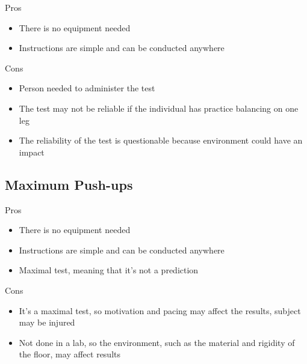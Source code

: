 \documentclass[12pt]{article}
\begin{document}
\begin{minipage}[t]{0.5\textwidth}
    \begin{center}Pros\end{center}
    \begin{itemize}
        \item There is no equipment needed
        \item Instructions are simple and can be conducted anywhere
    \end{itemize}
\end{minipage}
\begin{minipage}[t]{0.5\textwidth}
    \begin{center}Cons\end{center}
    \begin{itemize}
        \item Person needed to administer the test
        \item The test may not be reliable if the individual has practice balancing on one leg
        \item The reliability of the test is questionable because environment could have an impact
    \end{itemize}
\end{minipage}

\subsection*{Maximum Push-ups}

\begin{minipage}[t]{0.5\textwidth}
    \begin{center}Pros\end{center}
    \begin{itemize}
        \item There is no equipment needed
        \item Instructions are simple and can be conducted anywhere
        \item Maximal test, meaning that it's not a prediction
    \end{itemize}
\end{minipage}
\begin{minipage}[t]{0.5\textwidth}
    \begin{center}Cons\end{center}
    \begin{itemize}
        \item It's a maximal test, so motivation and pacing may affect the results, subject may be injured
        \item Not done in a lab, so the environment, such as the material and rigidity of the floor, may affect results
    \end{itemize}
\end{minipage}
\end{document}
